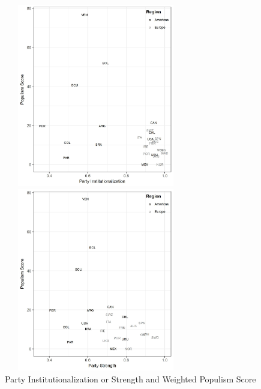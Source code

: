 \documentclass[a4paper,12pt]{article}\usepackage[]{graphicx}\usepackage[]{color}
\begin{document}
\begin{figure}[!htbp]
\centering
\parbox{3in}{\includegraphics[width=80mm, height = 80mm]{fig2_1.jpg}}%
\qquad
\begin{minipage}{2.75in}%
\includegraphics[width=80mm, height = 80mm]{fig2_2.jpg}
\end{minipage}%
\caption{Party Institutionalization or Strength and Weighted Populism Score}%
\label{fig2}%
\end{figure}
\
\par
\end{document}
